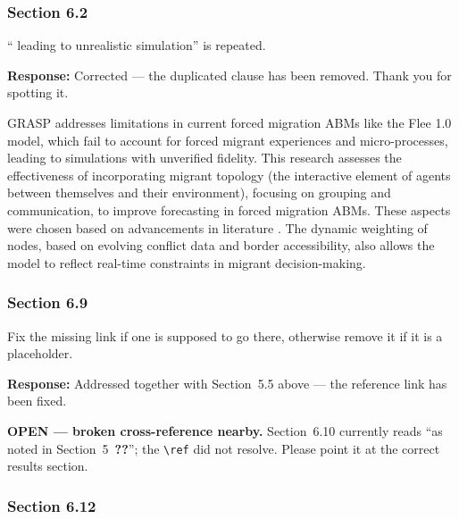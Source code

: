 \documentclass[11pt,a4paper]{article}
\begin{document}
\subsubsection*{Section 6.2}

\begin{reviewbox}
`` leading to unrealistic simulation'' is repeated.
\end{reviewbox}

\textbf{Response:} Corrected --- the duplicated clause has been removed. Thank you for spotting it.

\vspace{0.3cm}
\begin{updatebox}
GRASP addresses limitations in current forced migration ABMs like the Flee 1.0 model, which fail to account for forced
migrant experiences and micro-processes, leading to simulations with unverified fidelity. This research assesses the
effectiveness of incorporating migrant topology (the interactive element of agents between themselves and their
environment), focusing on grouping and communication, to improve forecasting in forced migration ABMs. These aspects
were chosen based on advancements in literature \citep{84-hinsch2019rumours,163-bijak2021routes,121-collins2016agent-based}.
The dynamic weighting of nodes, based on evolving conflict data and border accessibility, also allows the model to
reflect real-time constraints in migrant decision-making.
\end{updatebox}

\subsubsection*{Section 6.9}

\begin{reviewbox}
Fix the missing link if one is supposed to go there, otherwise remove it if it is a placeholder.
\end{reviewbox}

\textbf{Response:} Addressed together with Section~5.5 above --- the reference link has been fixed.

\vspace{0.3cm}
\begin{flagbox}
\textbf{OPEN --- broken cross-reference nearby.} Section~6.10 currently reads ``as noted in Section~5~\textbf{??}'';
the \texttt{\textbackslash ref} did not resolve. Please point it at the correct results section.
\end{flagbox}

\subsubsection*{Section 6.12}
\end{document}
